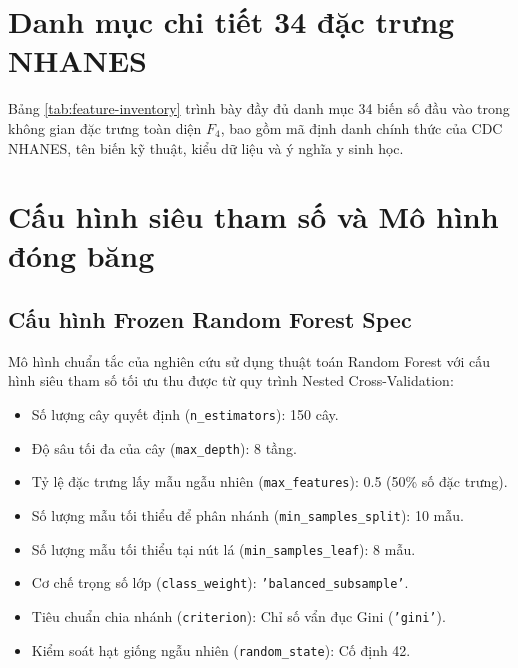 \chapter{Danh mục chi tiết 34 đặc trưng NHANES}
\label{app:feature-inventory}

Bảng \ref{tab:feature-inventory} trình bày đầy đủ danh mục 34 biến số đầu vào trong không gian đặc trưng toàn diện $F_4$, bao gồm mã định danh chính thức của CDC NHANES, tên biến kỹ thuật, kiểu dữ liệu và ý nghĩa y sinh học.



\chapter{Cấu hình siêu tham số và Mô hình đóng băng}
\label{app:hyperparameters}

\section{Cấu hình Frozen Random Forest Spec}
Mô hình chuẩn tắc của nghiên cứu sử dụng thuật toán Random Forest với cấu hình siêu tham số tối ưu thu được từ quy trình Nested Cross-Validation:
\begin{itemize}
    \item Số lượng cây quyết định (\texttt{n\_estimators}): 150 cây.
    \item Độ sâu tối đa của cây (\texttt{max\_depth}): 8 tầng.
    \item Tỷ lệ đặc trưng lấy mẫu ngẫu nhiên (\texttt{max\_features}): 0.5 (50\% số đặc trưng).
    \item Số lượng mẫu tối thiểu để phân nhánh (\texttt{min\_samples\_split}): 10 mẫu.
    \item Số lượng mẫu tối thiểu tại nút lá (\texttt{min\_samples\_leaf}): 8 mẫu.
    \item Cơ chế trọng số lớp (\texttt{class\_weight}): \texttt{'balanced\_subsample'}.
    \item Tiêu chuẩn chia nhánh (\texttt{criterion}): Chỉ số vẩn đục Gini (\texttt{'gini'}).
    \item Kiểm soát hạt giống ngẫu nhiên (\texttt{random\_state}): Cố định 42.
\end{itemize}

